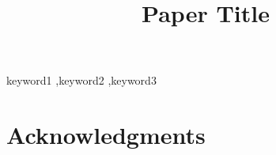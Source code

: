 \documentclass[preprint,12pt]{elsarticle}
\begin{document}
\begin{frontmatter}

\title{Paper Title}


\begin{abstract}

\end{abstract}

\begin{keyword}
keyword1 \sep keyword2 \sep keyword3
\end{keyword}

\end{frontmatter}






\section*{Acknowledgments}




\appendix

\end{document}
